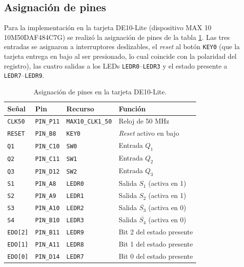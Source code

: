 
\label{fig:top}

\subsection{Asignación de pines}

Para la implementación en la tarjeta DE10-Lite (dispositivo MAX 10 10M50DAF484C7G) se
realizó la asignación de pines de la tabla \ref{tab:pines}. Las tres entradas se
asignaron a interruptores deslizables, el \textit{reset} al botón \texttt{KEY0} (que la
tarjeta entrega en bajo al ser presionado, lo cual coincide con la polaridad del
registro), las cuatro salidas a los LEDs \texttt{LEDR0}--\texttt{LEDR3} y el estado
presente a \texttt{LEDR7}--\texttt{LEDR9}.

\begin{table}[H]
  \centering
  \caption{Asignación de pines en la tarjeta DE10-Lite.}
  \label{tab:pines}
  \begin{tabular}{@{}l l l l@{}}
    \toprule
    \textbf{Señal} & \textbf{Pin} & \textbf{Recurso} & \textbf{Función} \\
    \midrule
    \texttt{CLK50}  & \texttt{PIN\_P11} & \texttt{MAX10\_CLK1\_50} & Reloj de 50 MHz \\
    \texttt{RESET}  & \texttt{PIN\_B8}  & \texttt{KEY0}   & \textit{Reset} activo en bajo \\
    \texttt{Q1}     & \texttt{PIN\_C10} & \texttt{SW0}    & Entrada $Q_1$ \\
    \texttt{Q2}     & \texttt{PIN\_C11} & \texttt{SW1}    & Entrada $Q_2$ \\
    \texttt{Q3}     & \texttt{PIN\_D12} & \texttt{SW2}    & Entrada $Q_3$ \\
    \texttt{S1}     & \texttt{PIN\_A8}  & \texttt{LEDR0}  & Salida $S_1$ (activa en 1) \\
    \texttt{S2}     & \texttt{PIN\_A9}  & \texttt{LEDR1}  & Salida $S_2$ (activa en 1) \\
    \texttt{S3}     & \texttt{PIN\_A10} & \texttt{LEDR2}  & Salida $\overline{S_3}$ (activa en 0) \\
    \texttt{S4}     & \texttt{PIN\_B10} & \texttt{LEDR3}  & Salida $\overline{S_4}$ (activa en 0) \\
    \texttt{EDO[2]} & \texttt{PIN\_B11} & \texttt{LEDR9}  & Bit 2 del estado presente \\
    \texttt{EDO[1]} & \texttt{PIN\_A11} & \texttt{LEDR8}  & Bit 1 del estado presente \\
    \texttt{EDO[0]} & \texttt{PIN\_D14} & \texttt{LEDR7}  & Bit 0 del estado presente \\
    \bottomrule
  \end{tabular}
\end{table}


